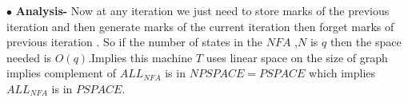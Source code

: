 \documentclass[a4paper, 11pt]{article}
\begin{document}
{\begin{itemize}
		$\bullet$ \textbf{Analysis-} Now at any iteration we just need to store marks of the previous iteration and then generate marks of the current iteration then forget marks of previous iteration . So if the number of states in the $NFA$ ,$N$ is $q$ then the space needed is $O(q)$.Implies this machine $T$ uses linear space on the size of graph implies complement of $ALL_{NFA}$ is in $NPSPACE=PSPACE$ which implies $ALL_{NFA}$ is in $PSPACE$.  		
		
		\end{itemize}
	}
	
	

	

	
\end{document}
